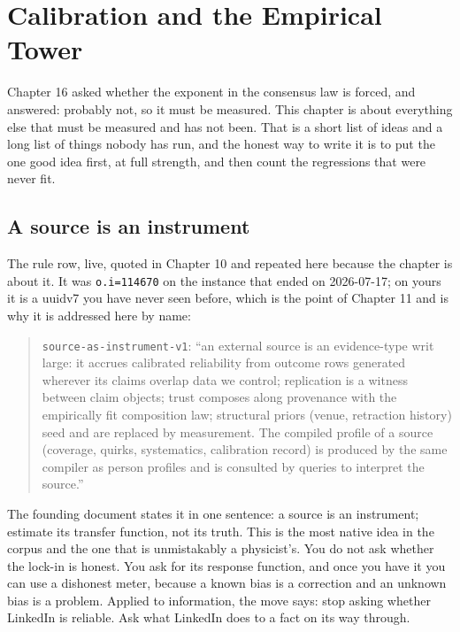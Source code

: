 \chapter{Calibration and the Empirical Tower}\label{ch:calibration}

Chapter 16 asked whether the exponent in the consensus law is forced, and answered: probably not, so it must be measured. This chapter is about everything else that must be measured and has not been. That is a short list of ideas and a long list of things nobody has run, and the honest way to write it is to put the one good idea first, at full strength, and then count the regressions that were never fit.

\section{A source is an instrument}

The rule row, live, quoted in Chapter 10 and repeated here because the chapter is about it. It was \texttt{o.i=114670} on the instance that ended on 2026-07-17; on yours it is a uuidv7 you have never seen before, which is the point of Chapter 11 and is why it is addressed here by name:

\begin{quote}
\small\texttt{source-as-instrument-v1}: ``an external source is an evidence-type writ large: it accrues calibrated reliability from outcome rows generated wherever its claims overlap data we control; replication is a witness between claim objects; trust composes along provenance with the empirically fit composition law; structural priors (venue, retraction history) seed and are replaced by measurement. The compiled profile of a source (coverage, quirks, systematics, calibration record) is produced by the same compiler as person profiles and is consulted by queries to interpret the source.''
\end{quote}

The founding document states it in one sentence: a source is an instrument; estimate its transfer function, not its truth. This is the most native idea in the corpus and the one that is unmistakably a physicist's. You do not ask whether the lock-in is honest. You ask for its response function, and once you have it you can use a dishonest meter, because a known bias is a correction and an unknown bias is a problem. Applied to information, the move says: stop asking whether LinkedIn is reliable. Ask what LinkedIn does to a fact on its way through.

